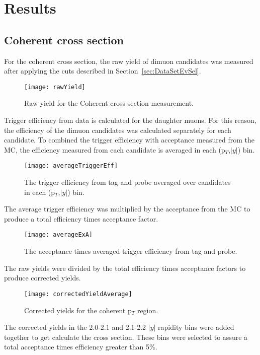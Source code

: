 \chapter{Results} 
  \section{Coherent cross section}

  For the coherent cross section, the raw yield of dimuon candidates was
    measured after applying the cuts described in Section~\ref{sec:DataSetEvSel}.
  \begin{figure}[!Hhtb]
    \centering
    \texttt{[image: rawYield]}
    \caption{Raw yield for the Coherent cross section measurement.}
    \label{fig:rawYieldCo}
  \end{figure}

  Trigger efficiency from data is calculated for the daughter muons.
  For this reason, the efficiency of the dimuon candidates was calculated 
    separately for each candidate. 
  To combined the trigger efficiency with acceptance measured from the MC, 
    the efficiency measured from each candidate is averaged in each (p$_{T}$,$|y|$)
    bin.
  \begin{figure}[!Hhbt]
    \centering
    \texttt{[image: averageTriggerEff]}
    \caption{The trigger efficiency from tag and probe averaged over candidates
      in each (p$_{T}$,$|y|$) bin.}
    \label{fig:avTrigEffCo}
  \end{figure}
  The average trigger efficiency was multiplied by the acceptance from the MC 
    to produce a total efficiency times acceptance factor. 
  \begin{figure}[!Hhtb]
    \centering
    \texttt{[image: averageExA]}
    \caption{The acceptance times averaged trigger efficiency from tag and 
      probe.}
    \label{fig:avAccEff}
  \end{figure}

  The raw yields were divided by the total efficiency times acceptance factors
    to produce corrected yields.
  \begin{figure}[!Hhtb]
    \centering
    \texttt{[image: correctedYieldAverage]}
    \caption{Corrected yields for the coherent p$_{T}$ region.}
    \label{fig:corYieldCo}
  \end{figure}

  The corrected yields in the 2.0-2.1 and 2.1-2.2 $|y|$ rapidity bins were added 
    together to get calculate the cross section. 
  These bins were selected to assure a total acceptance times efficiency 
    greater than 5\%.

